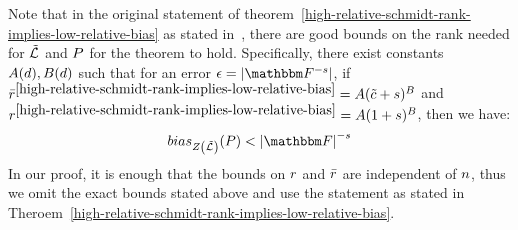 \begin{remark}
    Note that in the original statement of theorem~\ref{high-relative-schmidt-rank-implies-low-relative-bias} as stated in~\cite[Theorem 1.8]{lampert2021relative},
    there are good bounds on the rank needed for $\varpolyset$ and $\genpoly$ for the theorem to hold.
    \newline
    Specifically, there exist constants $A(d), B(d)$ such that for an error $\epsilon = \abs{\basefield^{-s}}$,
    if ${\bar{r}}^{\ref{high-relative-schmidt-rank-implies-low-relative-bias}} = A({\tilde{c}} + s)^B$ and ${{r}}^{\ref{high-relative-schmidt-rank-implies-low-relative-bias}} = A(1 + s)^B$,
    then we have:
    \[
        \relbias{\zerofunc{\varpolyset}}{\genpoly} < \abs{\basefield}^{-s}
    \]
    \newline
    In our proof, it is enough that the bounds on ${{r}}$ and ${\bar{r}}$ are independent of $n$, thus we omit the exact bounds stated above and use the statement as stated in Theroem~\ref{high-relative-schmidt-rank-implies-low-relative-bias}.
\end{remark}

